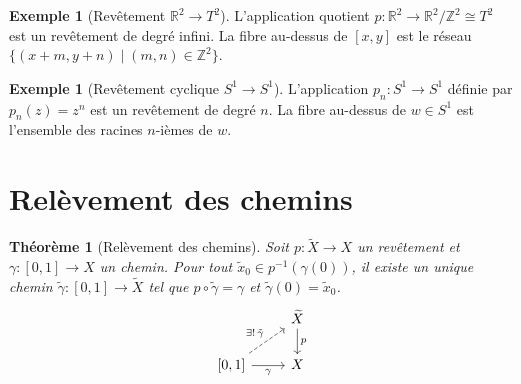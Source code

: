 \documentclass[12pt,a4paper,openany]{book}
\theoremstyle{definition}
\newtheorem{exemple}[definition]{Exemple}
\theoremstyle{plain}
\newtheorem{theoreme}[definition]{Théorème}
\theoremstyle{remark}
\newcommand{\Z}{\mathbb{Z}}
\newcommand{\R}{\mathbb{R}}
\begin{document}
\begin{exemple}[{Revêtement $\R^2 \to T^2$}]\label{ex:rev-plan-tore}
L'application quotient $p \colon \R^2 \to \R^2/\Z^2 \cong T^2$ est un revêtement de degré
infini. La fibre au-dessus de $[x, y]$ est le réseau $\{(x+m, y+n) \mid (m,n) \in \Z^2\}$.

\begin{center}
\end{center}
\end{exemple}

\begin{exemple}[{Revêtement cyclique $S^1 \to S^1$}]\label{ex:rev-cyclique}
L'application $p_n \colon S^1 \to S^1$ définie par $p_n(z) = z^n$ est un revêtement
de degré $n$. La fibre au-dessus de $w \in S^1$ est l'ensemble des racines $n$-ièmes de $w$.
\end{exemple}

\section{Relèvement des chemins}\label{sec:relevement-chemins}

\begin{theoreme}[Relèvement des chemins]\label{thm:relevement-chemins}
Soit $p \colon \widetilde{X} \to X$ un revêtement et $\gamma \colon [0,1] \to X$ un chemin.
Pour tout $\tilde{x}_0 \in p^{-1}(\gamma(0))$, il existe un unique chemin
$\tilde{\gamma} \colon [0,1] \to \widetilde{X}$ tel que $p \circ \tilde{\gamma} = \gamma$
et $\tilde{\gamma}(0) = \tilde{x}_0$.
\[
\begin{tikzcd}
& \widetilde{X} \arrow[d, "p"] \\
{[0,1]} \arrow[r, "\gamma"'] \arrow[ur, dashed, "\exists!\,\tilde{\gamma}"] & X
\end{tikzcd}
\]
\end{theoreme}
\end{document}
